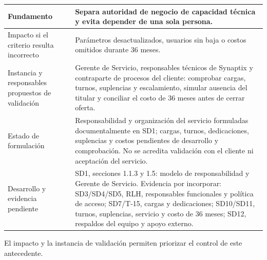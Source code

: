 \begin{longtable}{|L{.25\linewidth}|L{\dimexpr.75\arrayrulewidth\relax}|}
Fundamento & Separa autoridad de negocio de capacidad técnica y evita depender de una sola persona. \\ \hline
{}
Impacto si el criterio resulta incorrecto & Parámetros desactualizados, usuarios sin baja o costos omitidos durante 36 meses. \\ \hline
Instancia y responsables propuestos de validación & Gerente de Servicio, responsables técnicos de Synaptix y contraparte de procesos del cliente: comprobar cargas, turnos, suplencias y escalamiento, simular ausencia del titular y conciliar el costo de 36 meses antes de cerrar oferta. \\ \hline
{}
Estado de formulación & Responsabilidad y organización del servicio formuladas documentalmente en SD1; cargas, turnos, dedicaciones, suplencias y costos pendientes de desarrollo y comprobación. No se acredita validación con el cliente ni aceptación del servicio. \\ \hline
Desarrollo y evidencia pendiente & SD1, secciones 1.1.3 y 1.5: modelo de responsabilidad y Gerente de Servicio. Evidencia por incorporar: SD3/SD4/SD5, RLH, responsables funcionales y política de acceso; SD7/T-15, cargas y dedicaciones; SD10/SD11, turnos, suplencias, servicio y costo de 36 meses; SD12, respaldos del equipo y apoyo externo. \\ \hline
\end{longtable}

El impacto y la instancia de validación permiten priorizar el control de este antecedente.
